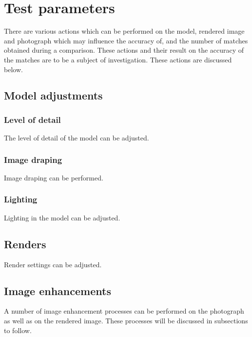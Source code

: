 \documentclass[11pt,a4paper]{report}
\begin{document}
	\section{Test parameters}
	\label{test_parameters}
		There are various actions which can be performed on the model, rendered image and photograph which may influence the accuracy of, and the number of matches obtained during a comparison. These actions and their result on the accuracy of the matches are to be a subject of investigation. These actions are discussed below.
		
		\subsection{Model adjustments}
			\subsubsection{Level of detail}
				The level of detail of the model can be adjusted.
				
			\subsubsection{Image draping}
				Image draping can be performed.
			
			\subsubsection{Lighting}
				Lighting in the model can be adjusted.
		
		\subsection{Renders}
			Render settings can be adjusted.
			
		\subsection{Image enhancements}
			A number of image enhancement processes can be performed on the photograph as well as on the rendered image. These processes will be discussed in subsections to follow.
\end{document}
